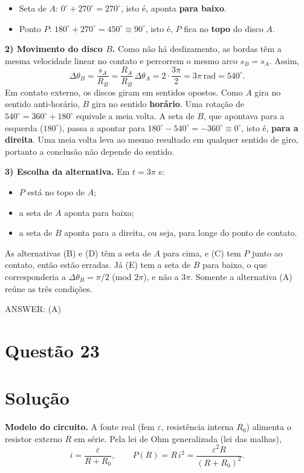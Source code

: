 \documentclass{article}%
\begin{document}
\begin{itemize}
\item Seta de $A$: $0^\circ+270^\circ=270^\circ$, isto é, aponta \textbf{para baixo}.
\item Ponto $P$: $180^\circ+270^\circ=450^\circ\equiv 90^\circ$, isto é, $P$ fica no \textbf{topo} do disco $A$.
\end{itemize}

\textbf{2) Movimento do disco $B$.} Como não há deslizamento, as bordas têm a mesma velocidade linear no contato e percorrem o mesmo arco $s_B=s_A$. Assim,
\[
\Delta\theta_B=\frac{s_A}{R_B}=\frac{R_A}{R_B}\,\Delta\theta_A=2\cdot\frac{3\pi}{2}=3\pi\ \text{rad}=540^\circ .
\]
Em contato externo, os discos giram em sentidos opostos. Como $A$ gira no sentido anti-horário, $B$ gira no sentido \textbf{horário}. Uma rotação de $540^\circ=360^\circ+180^\circ$ equivale a meia volta. A seta de $B$, que apontava para a esquerda ($180^\circ$), passa a apontar para $180^\circ-540^\circ=-360^\circ\equiv 0^\circ$, isto é, \textbf{para a direita}. Uma meia volta leva ao mesmo resultado em qualquer sentido de giro, portanto a conclusão não depende do sentido.

\textbf{3) Escolha da alternativa.} Em $t=3\pi$ s:
\begin{itemize}
\item $P$ está no topo de $A$;
\item a seta de $A$ aponta para baixo;
\item a seta de $B$ aponta para a direita, ou seja, para longe do ponto de contato.
\end{itemize}
As alternativas (B) e (D) têm a seta de $A$ para cima, e (C) tem $P$ junto ao contato, então estão erradas. Já (E) tem a seta de $B$ para baixo, o que corresponderia a $\Delta\theta_B=\pi/2$ (mod $2\pi$), e não a $3\pi$. Somente a alternativa (A) reúne as três condições.

ANSWER: (A)%
\newpage%
\section*{Questão 23}

\section*{Solução}

\textbf{Modelo do circuito.} A fonte real (fem $\varepsilon$, resistência interna $R_0$) alimenta o resistor externo $R$ em série. Pela lei de Ohm generalizada (lei das malhas),
\[
i=\frac{\varepsilon}{R+R_0},\qquad P(R)=R\,i^2=\frac{\varepsilon^2 R}{(R+R_0)^2}.
\]
\end{document}

